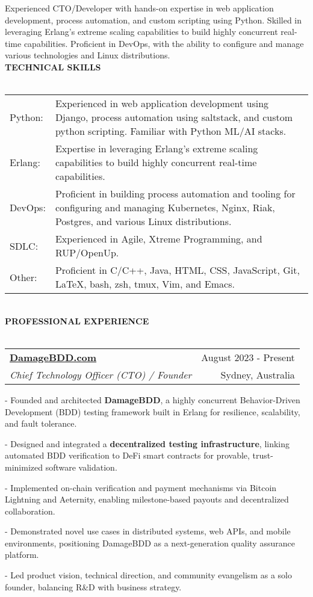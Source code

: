 \documentclass[12pt]{article}
\makeatletter
\newcommand{\lineunder}{\vspace*{-10pt} \\ \hspace*{-18pt} \hrulefill \vspace{2pt}\\}
\newcommand{\header}[1]{{\hspace*{-15pt}\vspace*{-0pt}\\ \uppercase{\textbf {#1}}}  \lineunder}
\newcommand{\employer}[4]{ 
        \vspace*{6pt}
	\begin{tabular*}{\textwidth}{l@{\extracolsep{\fill}}r}
	\textbf{#1} & #2 \\
                #3  & #4 \\ 
	\end{tabular*}
}
\newenvironment{achievements}{
        \vspace{-0pt}
        \begin{list}
        {}
        {\topsep 0pt \itemsep -3pt}
}
{
        \end{list}
}
\makeatother
\begin{document}
Experienced CTO/Developer with hands-on expertise in web application development, process automation, and custom scripting using Python. Skilled in leveraging Erlang's extreme scaling capabilities to build highly concurrent real-time capabilities. Proficient in DevOps, with the ability to configure and manage various technologies and Linux distributions.
\vspace{15pt}
\header{Technical Skills}
\vspace{2pt}
\begin{tabular*}{\textwidth}{p{3cm}p{}}
Python: & Experienced in web application development using Django, process automation using saltstack, and custom python scripting. Familiar with Python ML/AI stacks. \\
Erlang: & Expertise in leveraging Erlang's extreme scaling capabilities to build highly concurrent real-time capabilities. \\
DevOps: & Proficient in building process automation and tooling for configuring and managing Kubernetes, Nginx, Riak, Postgres, and various Linux distributions. \\ 
SDLC: & Experienced in Agile, Xtreme Programming, and RUP/OpenUp.\\
Other: & Proficient in C/C++, Java, HTML, CSS, JavaScript, Git, \LaTeX, bash, zsh, tmux, Vim, and Emacs. \\

\end{tabular*}
\vspace{15pt}
\header{Professional Experience}
\employer{\href{http://damagebdd.com/}{DamageBDD.com}}{August 2023 - Present}{\emph{Chief Technology Officer (CTO) / Founder}} {Sydney, Australia}
    \begin{achievements}
      \item[-] Founded and architected \textbf{DamageBDD}, a highly concurrent Behavior-Driven Development (BDD) testing framework built in Erlang for resilience, scalability, and fault tolerance.
      \item[-] Designed and integrated a \textbf{decentralized testing infrastructure}, linking automated BDD verification to DeFi smart contracts for provable, trust-minimized software validation.
      \item[-] Implemented on-chain verification and payment mechanisms via Bitcoin Lightning and Aeternity, enabling milestone-based payouts and decentralized collaboration.
      \item[-] Demonstrated novel use cases in distributed systems, web APIs, and mobile environments, positioning DamageBDD as a next-generation quality assurance platform.
      \item[-] Led product vision, technical direction, and community evangelism as a solo founder, balancing R\&D with business strategy.
    \end{achievements}
\end{document}
